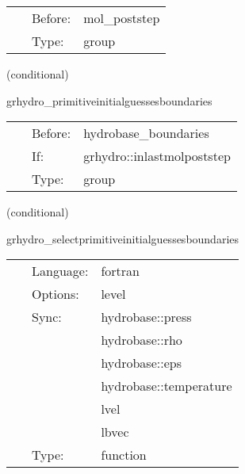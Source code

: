\documentclass{article}
\begin{document}
\hspace{5mm}{\it apply boundary conditions to all primitives } 


\hspace{5mm}

 \begin{tabular*}{160mm}{cll} 
~ & Before:  & mol\_poststep \\ 
~ & Type:  & group \\ 
\end{tabular*} 


\vspace{5mm}

   (conditional) 

\hspace{5mm} grhydro\_primitiveinitialguessesboundaries 

\hspace{5mm}{\it apply boundary conditions to those primitives used as initial guesses } 


\hspace{5mm}

 \begin{tabular*}{160mm}{cll} 
~ & Before:  & hydrobase\_boundaries \\ 
~ & If:  & grhydro::inlastmolpoststep \\ 
~ & Type:  & group \\ 
\end{tabular*} 


\vspace{5mm}

   (conditional) 

\hspace{5mm} grhydro\_selectprimitiveinitialguessesboundaries 

\hspace{5mm}{\it select initial guess primitive variables for boudary conditions } 


\hspace{5mm}

 \begin{tabular*}{160mm}{cll} 
~ & Language:  & fortran \\ 
~ & Options:  & level \\ 
~ & Sync:  & hydrobase::press \\ 
~& ~ &hydrobase::rho\\ 
~& ~ &hydrobase::eps\\ 
~& ~ &hydrobase::temperature\\ 
~& ~ &lvel\\ 
~& ~ &lbvec\\ 
~ & Type:  & function \\ 
\end{tabular*} 
\end{document}
